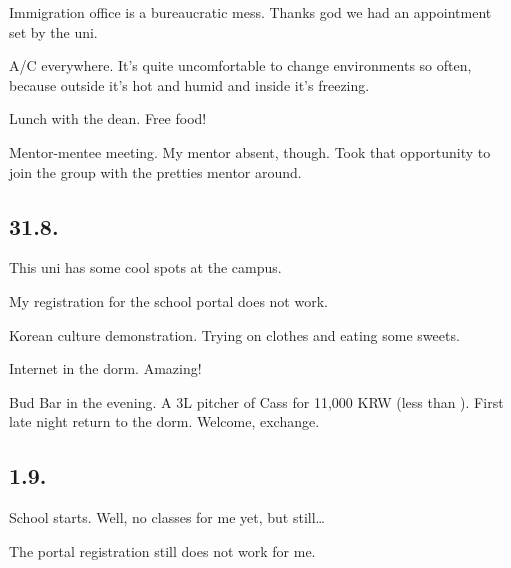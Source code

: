 \begin{post}
\begin{content}
\begin{itemize*}
	\item Immigration office is a bureaucratic mess. Thanks god we had an appointment set by the uni.

	\item A/C everywhere. It's quite uncomfortable to change environments so often, because outside it's hot and humid and inside it's freezing.

	\item Lunch with the dean. Free food!

	\item Mentor-mentee meeting. My mentor absent, though. Took that opportunity to join the group with the pretties mentor around.

\end{itemize*}

\subsection{31.8.}

\begin{itemize*}

	\item This uni has some cool spots at the campus.

	\item My registration for the school portal does not work.

	\item Korean culture demonstration. Trying on clothes and eating some sweets.

	\item Internet in the dorm. Amazing!

	\item Bud Bar in the evening. A 3L pitcher of Cass for 11,000 KRW (less than ). First late night return to the dorm. Welcome, exchange.

\end{itemize*}

\subsection{1.9.}

\begin{itemize*}

	\item School starts. Well, no classes for me yet, but still\ldots

	\item The portal registration still does not work for me.


\end{itemize*}
\end{content}
\end{post}
